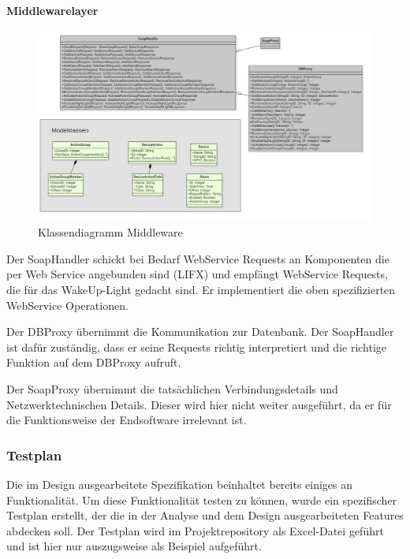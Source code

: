 \documentclass[]{article}
\let\oldparagraph\paragraph
\renewcommand{\paragraph}[1]{\oldparagraph{#1}\mbox{}}
\begin{document}
\paragraph{Middlewarelayer}\label{middlewarelayer}

\begin{figure}[H]
\centering
\includegraphics{./WI21_Klassendiagramm_Middleware.jpeg} 
\caption{Klassendiagramm Middleware}
\end{figure} 
Der SoapHandler schickt bei Bedarf WebService Requests an Komponenten die per Web
Service angebunden sind (LIFX) und empfängt WebService Requests, die für
das WakeUp-Light gedacht sind. Er implementiert die oben spezifizierten
WebService Operationen.

Der DBProxy übernimmt die Kommunikation zur Datenbank. Der SoapHandler
ist dafür zuständig, dass er seine Requests richtig interpretiert und
die richtige Funktion auf dem DBProxy aufruft.

Der SoapProxy übernimmt die tatsächlichen Verbindungsdetails und
Netzwerktechnischen Details. Dieser wird hier nicht weiter ausgeführt,
da er für die Funktionsweise der Endsoftware irrelevant ist.

\subsubsection{Testplan}\label{testplan}

Die im Design ausgearbeitete Spezifikation beinhaltet bereits einiges an
Funktionalität. Um diese Funktionalität testen zu können, wurde ein
spezifischer Testplan erstellt, der die in der Analyse und dem Design
ausgearbeiteten Features abdecken soll. Der Testplan wird im
Projektrepository als Excel-Datei geführt und ist hier nur auszugsweise
als Beispiel aufgeführt.
\end{document}
